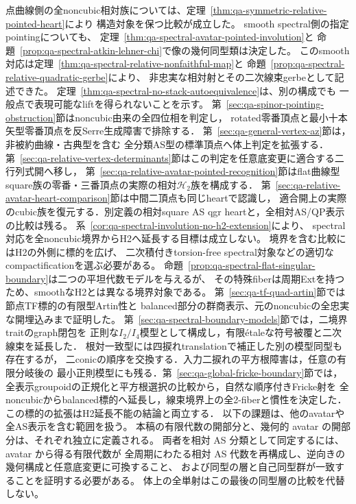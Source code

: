\documentclass[a4paper,11pt]{ltjsarticle}
\numberwithin{equation}{section}
\theoremstyle{plain}
\theoremstyle{definition}
\theoremstyle{remark}
\newcommand{\HH}{\mathcal H_2}
\begin{document}
点曲線側の全noncubic相対族については、定理~\ref{thm:qa-symmetric-relative-pointed-heart}により
構造対象を保つ比較が成立した。
smooth spectral側の指定pointingについても、
定理~\ref{thm:qa-spectral-avatar-pointed-involution}と
命題~\ref{prop:qa-spectral-atkin-lehner-chi}で像の幾何同型類は決定した。
このsmooth対応は定理~\ref{thm:qa-spectral-relative-nonfaithful-map}と
命題~\ref{prop:qa-spectral-relative-quadratic-gerbe}により、
非忠実な相対射とその二次線束gerbeとして記述できた。
定理~\ref{thm:qa-spectral-no-stack-autoequivalence}は、別の構成でも
一般点で表現可能なliftを得られないことを示す。
第~\ref{sec:qa-spinor-pointing-obstruction}節はnoncubic由来の全四位相を判定し，
rotated零番頂点と最小十本矢型零番頂点を反Serre生成障害で排除する．
第~\ref{sec:qa-general-vertex-az}節は，非被約曲線・古典型を含む
全分類AS型の標準頂点へ体上判定を拡張する．
第~\ref{sec:qa-relative-vertex-determinants}節はこの判定を任意底変更に適合する二行列式開へ移し，
第~\ref{sec:qa-relative-avatar-pointed-recognition}節はflat曲線型square族の零番・三番頂点の実際の相対$\HH$族を構成する．
第~\ref{sec:qa-relative-avatar-heart-comparison}節は中間二頂点も同じheartで認識し，
適合開上の実際のcubic族を復元する．別定義の相対square AS qgr heartと，全相対AS/QP表示の比較は残る。
系~\ref{cor:qa-spectral-involution-no-h2-extension}により、
spectral対応を全noncubic境界からH2へ延長する目標は成立しない。
境界を含む比較にはH2の外側に標的を広げ、
二次積付きtorsion-free spectral対象などの適切なcompactificationを選ぶ必要がある。
命題~\ref{prop:qa-spectral-flat-singular-boundary}は二つの平坦代数モデルを与えるが、
その特殊fiberは周期Extを持つため、smoothなH2とは異なる境界対象である。
第~\ref{sec:qa-tf-quad-artin}節では節点TF標的の有限型Artin性と
balanced部分の群商表示、元のnoncubicの全忠実な開埋込みまで証明した。
第~\ref{sec:qa-spectral-boundary-models}節では，二境界traitのgraph閉包を
正則な$I_2/I_4$模型として構成し，有限\'etaleな符号被覆と二次線束を延長した．
根対一致型には四捩れtranslationで補正した別の模型同型も存在するが，
二conicの順序を交換する．入力二捩れの平方根障害は，任意の有限分岐後の
最小正則模型にも残る．第~\ref{sec:qa-global-fricke-boundary}節では，
全表示groupoidの正規化と平方根選択の比較から，自然な順序付きFricke射を
全noncubicからbalanced標的へ延長し，線束境界上の全2-fiberと慣性を決定した．
この標的の拡張はH2延長不能の結論と両立する．
以下の課題は、他のavatarや全AS表示を含む範囲を扱う。
本稿の有限代数の開部分と、幾何的 avatar の開部分は、それぞれ独立に定義される。
両者を相対 AS 分類として同定するには、avatar から得る有限代数が
全周期にわたる相対 AS 代数を再構成し、逆向きの幾何構成と任意底変更に可換すること、
および同型の層と自己同型群が一致することを証明する必要がある。
体上の全単射はこの最後の同型層の比較を代替しない。
\end{document}
